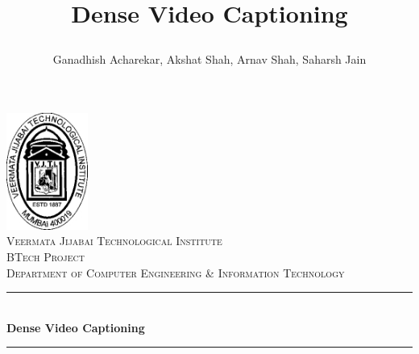 \documentclass[]{book}
\title{
	\incl

	Dense Video Captioning
}
\author{Ganadhish Acharekar, Akshat Shah, Arnav Shah, Saharsh Jain}
\begin{document}

\begin{titlepage} %
	\newcommand{\HRule}{\rule{\linewidth}{0.5mm}} %
	
	\center %
	

	\includegraphics[width=0.2\textwidth]{assets/img/vjti.png}\\[1cm] %

	\textsc{\LARGE Veermata Jijabai Technological Institute}\\[1.5cm] %
	
	\textsc{\Large BTech Project}\\[0.5cm] %
	
	\textsc{\large Department of Computer Engineering \& Information Technology}\\[0.5cm] %
	
	
	\HRule\\[0.4cm]
	
	{\huge\bfseries Dense Video Captioning}\\[0.4cm] %
	
	\HRule\\[1.5cm]
	
	

\end{titlepage}
\end{document}
